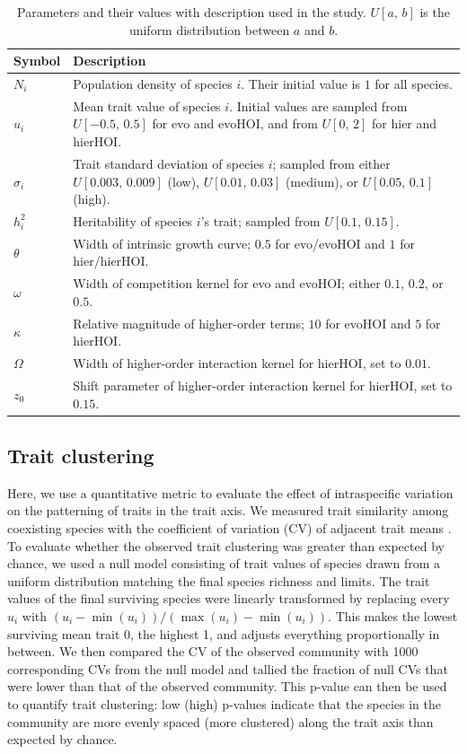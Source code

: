 \documentclass[11pt]{article}
\begin{document}
\begin{table}[t]
\begin{tabular}{lp{}}
Symbol & Description \\
\hline
$N_i$ & Population density of species $i$. Their initial value is $1$ for all species.\\
$u_i$ & Mean trait value of species $i$. Initial values are sampled from $U[-0.5, \, 0.5]$ for evo and evoHOI, and from $U[0, \, 2]$ for hier and hierHOI.\\
$\sigma_i$ & Trait standard deviation of species $i$; sampled from either $U[0.003, \, 0.009]$ (low), $U[0.01, \, 0.03]$ (medium), or $U[0.05, \, 0.1]$ (high). \\
$h_i^2$ & Heritability of species $i$'s trait; sampled from $U[0.1, \, 0.15]$. \\
$\theta$ & Width of intrinsic growth curve; $0.5$ for evo/evoHOI and $1$ for hier/hierHOI. \\
$\omega$ & Width of competition kernel for evo and evoHOI; either $0.1$, $0.2$, or $0.5$. \\
$\kappa$ & Relative magnitude of higher-order terms; $10$ for evoHOI and $5$ for hierHOI. \\
$\Omega$ & Width of higher-order interaction kernel for hierHOI, set to $0.01$. \\ 
$z_0$ & Shift parameter of higher-order interaction kernel for hierHOI, set to $0.15$.
\end{tabular}
\caption{Parameters and their values with description used in the study. $U[a, \, b]$ is the uniform distribution between $a$ and $b$.}
\label{tab:params}
\end{table}


\subsection{Trait clustering} \label{sec:clustering}

Here, we use a quantitative metric to evaluate the effect of intraspecific variation on the patterning of traits in the trait axis. We measured trait similarity among coexisting species with the coefficient of variation (CV) of adjacent trait means \citep{dandrea_challenges_2016}. To evaluate whether the observed trait clustering was greater than expected by chance, we used a null model consisting of trait values of species drawn from a uniform distribution matching the final species richness and limits. The trait values of the final surviving species were linearly transformed by replacing every $u_i$ with $(u_i - \min(u_i)) / (\max(u_i) - \min(u_i))$. This makes the lowest surviving mean trait 0, the highest 1, and adjusts everything proportionally in between. We then compared the CV of the observed community with 1000 corresponding CVs from the null model and tallied the fraction of null CVs that were lower than that of the observed community. This p-value can then be used to quantify trait clustering: low (high) p-values indicate that the species in the community are more evenly spaced (more clustered) along the trait axis than expected by chance.
\end{document}
